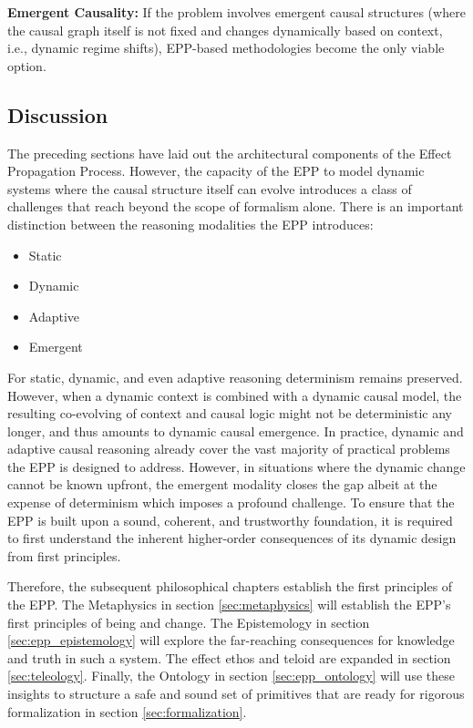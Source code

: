 \textbf{Emergent Causality:} If the problem involves emergent causal structures (where the causal graph itself is not fixed and changes dynamically based on context, i.e., dynamic regime shifts), EPP-based methodologies become the only viable option.



\newpage

\subsection{Discussion}
\label{sec:epp_discussion}

The preceding sections have laid out the architectural components of the Effect Propagation Process. However, the capacity of the EPP to model dynamic systems where the causal structure itself can evolve introduces a class of challenges that reach beyond the scope of formalism alone. There is an important distinction between the reasoning modalities the EPP introduces:

\begin{itemize}
	\item Static
	\item Dynamic
	\item Adaptive 
	\item Emergent 
\end{itemize}

For static, dynamic, and even adaptive reasoning determinism remains preserved. However, when a dynamic context is combined with a dynamic causal model, the resulting co-evolving of context and causal logic might not be deterministic any longer, and thus amounts to dynamic causal emergence. In practice, dynamic and adaptive causal reasoning already cover the vast majority of practical problems the EPP is designed to address. However, in situations where the dynamic change cannot be known upfront, the emergent modality closes the gap albeit at the expense of determinism which imposes a profound challenge. To ensure that the EPP is built upon a sound, coherent, and trustworthy foundation, it is required to first understand the inherent higher-order consequences of its dynamic design from first principles.

Therefore, the subsequent philosophical chapters establish the first principles of the EPP. The Metaphysics in section \ref{sec:metaphysics} will establish the EPP's first principles of being and change. The Epistemology in section \ref{sec:epp_epistemology} will explore the far-reaching consequences for knowledge and truth in such a system. The effect ethos and teloid are expanded in section \ref{sec:teleology}. Finally, the Ontology in section \ref{sec:epp_ontology} will use these insights to structure a safe and sound set of primitives that are ready for rigorous formalization in section \ref{sec:formalization}. 

\newpage